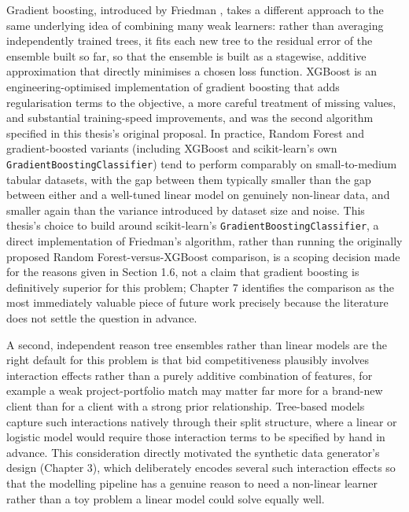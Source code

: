 \documentclass[12pt,oneside]{report}
\begin{document}
Gradient boosting, introduced by Friedman \citep{friedman2001greedy},
takes a different approach to the same underlying idea of combining many
weak learners: rather than averaging independently trained trees, it
fits each new tree to the residual error of the ensemble built so far,
so that the ensemble is built as a stagewise, additive approximation
that directly minimises a chosen loss function. XGBoost
\citep{chen2016xgboost} is an engineering-optimised implementation of
gradient boosting that adds regularisation terms to the objective, a
more careful treatment of missing values, and substantial training-speed
improvements, and was the second algorithm specified in this thesis's
original proposal. In practice, Random Forest and gradient-boosted
variants (including XGBoost and scikit-learn's own
\texttt{GradientBoostingClassifier}) tend to perform comparably on
small-to-medium tabular datasets, with the gap between them typically
smaller than the gap between either and a well-tuned linear model on
genuinely non-linear data, and smaller again than the variance
introduced by dataset size and noise. This thesis's choice to build
around scikit-learn's \texttt{GradientBoostingClassifier}, a direct
implementation of Friedman's \citeyearpar{friedman2001greedy} algorithm,
rather than running the originally proposed Random Forest-versus-XGBoost
comparison, is a scoping decision made for the reasons given in Section
1.6, not a claim that gradient boosting is definitively superior for
this problem; Chapter 7 identifies the comparison as the most
immediately valuable piece of future work precisely because the
literature does not settle the question in advance.

A second, independent reason tree ensembles rather than linear models
are the right default for this problem is that bid competitiveness
plausibly involves interaction effects rather than a purely additive
combination of features, for example a weak project-portfolio match may
matter far more for a brand-new client than for a client with a strong
prior relationship. Tree-based models capture such interactions natively
through their split structure, where a linear or logistic model would
require those interaction terms to be specified by hand in advance. This
consideration directly motivated the synthetic data generator's design
(Chapter 3), which deliberately encodes several such interaction effects
so that the modelling pipeline has a genuine reason to need a non-linear
learner rather than a toy problem a linear model could solve equally
well.
\end{document}
